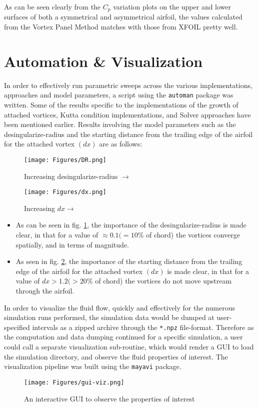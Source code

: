 As can be seen clearly from the $C_p$ variation plots on the upper and lower surfaces of both a symmetrical and asymmetrical airfoil, the values calculated from the Vortex Panel Method matches with those from XFOIL pretty well.


\section{Automation \& Visualization}
In order to effectively run parametric sweeps across the various implementations, approaches and model parameters, a script using the \texttt{automan} \parencite{Ramachandran2018-es} package was written. 
Some of the results specific to the implementations of the growth of attached vortices, Kutta condition implementations, and Solver approaches have been mentioned earlier. Results involving the model parameters such as the desingularize-radius and the starting distance from the trailing edge of the airfoil for the attached vortex $(dx)$ are as follows:
\begin{figure}[H]
	\centering
	\texttt{[image: Figures/DR.png]}
	\caption{Increasing desingularize-radius $\longrightarrow$}
	\label{fig:DR}
\end{figure}
\begin{figure}[H]
	\centering
	\texttt{[image: Figures/dx.png]}
	\caption{Increasing $dx \longrightarrow$}
	\label{fig:dx}
\end{figure}

\begin{itemize}
    \item As can be seen in fig. \ref{fig:DR}, the importance of the desingularize-radius is made clear, in that for a value of $\approx 0.1 (=10\%$ of chord) the vortices converge spatially, and in terms of magnitude.
    
    \item As seen in fig. \ref{fig:dx}, the importance of the starting distance from the trailing edge of the airfoil for the attached vortex $(dx)$ is made clear, in that for a value of $dx > 1.2 (>20\%$ of chord) the vortices do not move upstream through the airfoil.
\end{itemize}

In order to visualize the fluid flow, quickly and effectively for the numerous simulation runs performed, the simulation data would be dumped at user-specified intervals as a zipped archive through the \texttt{*.npz} file-format. Therefore as the computation and data dumping continued for a specific simulation, a user could call a separate visualization sub-routine, which would render a GUI to load the simulation directory, and observe the fluid properties of interest. The visualization pipeline was built using the \texttt{mayavi} \parencite{Ramachandran2011-yi} package.

\begin{figure}[H]
	\centering
	\texttt{[image: Figures/gui-viz.png]}
	\caption{An interactive GUI to observe the properties of interest}
	\label{fig:gui-viz}
\end{figure}
